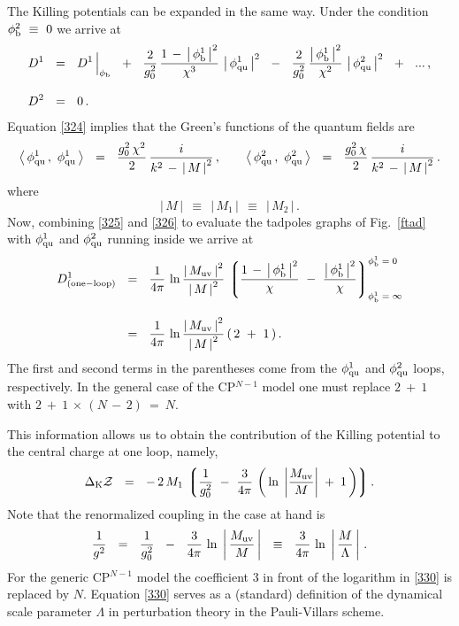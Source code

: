 \documentclass[epsfig,12pt]{article}
\def\beq{\begin{equation}}
\def\eeq{\end{equation}}
\def\beq{\begin{equation}}
\def\eeq{\end{equation}}
\newcommand{\lgr}{\left\lgroup}
\newcommand{\rgr}{\right\rgroup}
\begin{document}
	The Killing potentials can be expanded in the same way. Under the condition $\phi^2_{\rm b} ~\equiv~ 0$ 
	we arrive at
\begin{align}
%
\nonumber
	D^1  & ~~=~~
 	D^1 \, \Big|_{\phi_{\rm b}}  ~~+~~  
	\frac{2}{g_0^2}\, \frac{1 \,-\, \left|\, \phi^1_{\rm b} \,\right|^2}{\chi^3}\, 
	\left|\,  \phi^1_{\rm qu}\, \right|^2 ~~-~~  
	\frac{2}{g_0^2}\, \frac{\left|\, \phi^1_{\rm b} \,\right|^2}{\chi^2}\, 
	\left|\,  \phi^2_{\rm qu} \,\right|^2  ~~+~~  ...\,,
	\\[3mm]
%
	D^2  & ~~=~~  0\,.
\label{325}
\end{align}
	Equation \eqref{324}
	implies that the Green's functions of the quantum fields are
\beq
	\left\langle\, \phi^1_{\rm qu}\,,~ \phi^1_{\rm qu} \,\right\rangle  ~~=~~  
	\frac{g_0^2\,\chi^2 }{2}\, \frac{i}{k^2 \,-\, \left|\, M \,\right|^2}\,,
	\qquad
	\left\langle\, \phi^2_{\rm qu}\,,~ \phi^2_{\rm qu} \,\right\rangle  ~~=~~ 
	\frac{g_0^2\,\chi }{2 }\, \frac{i}{k^2 \,-\, \left|\, M \,\right|^2}\,.
\label{326}
\eeq
	where 
\beq
	\left|\, M \,\right|  ~~\equiv~~ \left|\, M_1 \,\right|  ~~\equiv~~ \left|\, M_2 \,\right|\,.
\eeq
	Now, combining \eqref{325} and \eqref{326} to evaluate the tadpoles graphs of Fig.~\ref{ftad}
	with $\phi^1_{\rm qu}$ and $\phi^2_{\rm qu}$ running inside we arrive at
\begin{align}
%
\nonumber
	D^1_{\rm (one-loop)} 
	&  ~~=~~
	\frac{1}{4\pi}\, \ln \frac{\left|\, M_{\rm uv} \,\right|^2}{\left|\, M \,\right|^2}\,
	\lgr \frac{1 \,-\, \left|\, \phi^1_{\rm b} \,\right|^2}{\chi} 
		~-~ \frac{ \left|\, \phi^1_{\rm b} \,\right|^2}{\chi}
	\rgr^{\phi_{\rm b}^{1} \;=\; 0}_{\phi_{\rm b}^{1} \;=\; \infty}
	\\[3mm]
%
	&  ~~=~~  
	\frac{1}{4\pi}\, \ln \frac{ \left|\, M_{\rm uv} \,\right|^2}{\left|\, M \,\right|^2}
	\left(\, 2 ~+~ 1 \,\right).
\end{align}
	The first and second terms in the parentheses come from the $\phi^1_{\rm qu}$ and $\phi^2_{\rm qu}$ loops, respectively. 
	In the general case of the CP$^{N-1}$ model
	one must replace $ 2 ~+~ 1$ with $ 2 ~+~ 1 \,\times\, (N \,-\, 2) ~=~ N$.

	This information allows us to obtain the contribution of the Killing potential to the central charge at one loop, namely,
\beq
	\Delta_{\rm K}{\mathcal Z}  ~~=~~  
	-\, 2\,M_1\, \lgr 
		\frac{1}{g_0^2} ~-~
		\frac{3}{4\pi}\, \left(\, \ln\; \left| \frac{M_{\rm uv}}{M} \right| \;+\; 1
			\,\right) 
		\rgr .
\label{329}
\eeq
	Note that the renormalized coupling in the case at hand is \cite{Novikov:1984ac}
\beq
	\frac{1}{g^2}  ~~=~~  \frac{1}{g_0^2} ~~-~~
	\frac{3}{4\pi}\, \ln\; \left|\, \frac{M_{\rm uv}}{M} \,\right|  ~~\equiv~~   
	\frac{3}{4\pi}\, \ln\; \left|\, \frac{M}{\Lambda} \,\right|\,.
\label{330}
\eeq
	For the generic CP$^{N-1}$ model the coefficient 3 in front of the logarithm 
	in \eqref{330} is replaced by $ N $. 
	Equation \eqref{330} serves as a (standard) definition of the dynamical scale parameter $ \Lambda $ 
	in perturbation theory in the Pauli-Villars scheme.
\end{document}
